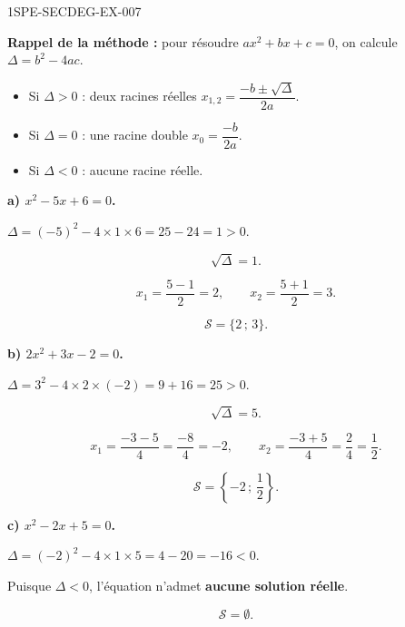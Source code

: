 \begin{corrige}{1SPE-SECDEG-EX-007}

\textbf{Rappel de la méthode :} pour résoudre $ax^2 + bx + c = 0$, on calcule $\Delta = b^2 - 4ac$.
\begin{itemize}
  \item Si $\Delta > 0$ : deux racines réelles $x_{1,2} = \dfrac{-b \pm \sqrt{\Delta}}{2a}$.
  \item Si $\Delta = 0$ : une racine double $x_0 = \dfrac{-b}{2a}$.
  \item Si $\Delta < 0$ : aucune racine réelle.
\end{itemize}

\medskip
\textbf{a) $x^2 - 5x + 6 = 0$.}


$\Delta = (-5)^2 - 4 \times 1 \times 6 = 25 - 24 = 1 > 0$.

\[\sqrt{\Delta} = 1.\]

\[x_1 = \frac{5 - 1}{2} = 2, \qquad x_2 = \frac{5 + 1}{2} = 3.\]

\[\boxed{\mathcal{S} = \{2\,;\,3\}.}\]

\medskip
\textbf{b) $2x^2 + 3x - 2 = 0$.}


$\Delta = 3^2 - 4 \times 2 \times (-2) = 9 + 16 = 25 > 0$.

\[\sqrt{\Delta} = 5.\]

\[x_1 = \frac{-3 - 5}{4} = \frac{-8}{4} = -2, \qquad x_2 = \frac{-3 + 5}{4} = \frac{2}{4} = \frac{1}{2}.\]

\[\boxed{\mathcal{S} = \left\{-2\,;\,\frac{1}{2}\right\}.}\]

\medskip
\textbf{c) $x^2 - 2x + 5 = 0$.}


$\Delta = (-2)^2 - 4 \times 1 \times 5 = 4 - 20 = -16 < 0$.

Puisque $\Delta < 0$, l'équation n'admet \textbf{aucune solution réelle}.

\[\boxed{\mathcal{S} = \emptyset.}\]

\end{corrige}
